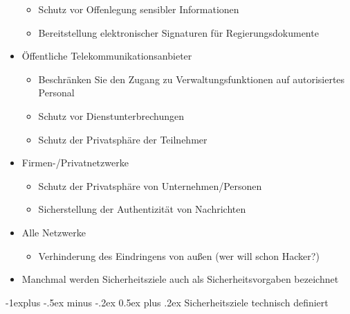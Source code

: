 \documentclass[a4paper]{article}
\makeatletter
\renewcommand{\subsection}{\@startsection{subsection}{2}{0mm}%
 {-1explus -.5ex minus -.2ex}%
 {0.5ex plus .2ex}%
 {\normalfont\normalsize\bfseries}}
\makeatother
\begin{document}
\begin{multicols}{3}
\begin{itemize}
              \begin{itemize}
                  \item
                        Schutz vor Offenlegung sensibler Informationen
                  \item
                        Bereitstellung elektronischer Signaturen für Regierungsdokumente
              \end{itemize}
        \item
              Öffentliche Telekommunikationsanbieter

              \begin{itemize}
                  \item
                        Beschränken Sie den Zugang zu Verwaltungsfunktionen auf
                        autorisiertes Personal
                  \item
                        Schutz vor Dienstunterbrechungen
                  \item
                        Schutz der Privatsphäre der Teilnehmer
              \end{itemize}
        \item
              Firmen-/Privatnetzwerke

              \begin{itemize}
                  \item
                        Schutz der Privatsphäre von Unternehmen/Personen
                  \item
                        Sicherstellung der Authentizität von Nachrichten
              \end{itemize}
        \item
              Alle Netzwerke

              \begin{itemize}
                  \item
                        Verhinderung des Eindringens von außen (wer will schon Hacker?)
              \end{itemize}
        \item
              Manchmal werden Sicherheitsziele auch als Sicherheitsvorgaben
              bezeichnet
    \end{itemize}


    \subsection{Sicherheitsziele technisch
        definiert}


\end{multicols}
\end{document}
